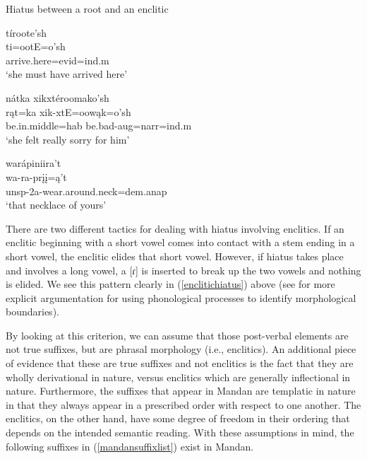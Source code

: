 \newpage
\begin{exe}

\item\label{enclitichiatus} Hiatus between a root and an enclitic

	\begin{xlist}
	
	\item \glll tíroote'sh\\
	ti=ootE=o'sh\\
	\textnormal{arrive.here}=evid=ind.m\\
	\glt `she must have arrived here' \citep[127]{hollow1973a}
	
	\item \glll nátka xikxtéroomako'sh\\
	rąt=ka xik-xtE=oowąk=o'sh\\
	\textnormal{be.in.middle}=hab \textnormal{be.bad}-aug=narr=ind.m\\
	\glt `she felt really sorry for him' \citep[129]{hollow1973a}
	
	\item \glll warápiniira't\\
	wa-ra-prįį=ą't\\
	unsp-2a-\textnormal{wear.around.neck}=dem.anap\\
	\glt `that necklace of yours' \citep[58]{hollow1973a}
	
	\end{xlist}

\end{exe}

There are two different tactics for dealing with hiatus involving enclitics. If an enclitic beginning with a short vowel comes into contact with a stem ending in a short vowel, the enclitic elides that short vowel. However, if hiatus takes place and involves a long vowel, a [ɾ] is inserted to break up the two vowels and nothing is elided. We see this pattern clearly in (\ref{enclitichiatus}) above (see  for more explicit argumentation for using phonological processes to identify morphological boundaries).

By looking at this criterion, we can assume that those post-verbal elements are not true suffixes, but are phrasal morphology (i.e., enclitics). An additional piece of evidence that these are true suffixes and not enclitics is the fact that they are wholly derivational in nature, versus enclitics which are generally inflectional in nature. Furthermore, the suffixes that appear in Mandan are templatic in nature in that they always appear in a prescribed order with respect to one another. The enclitics, on the other hand, have some degree of freedom in their ordering that depends on the intended semantic reading. %
With these assumptions in mind, the following suffixes in (\ref{mandansuffixlist}) exist in Mandan.

